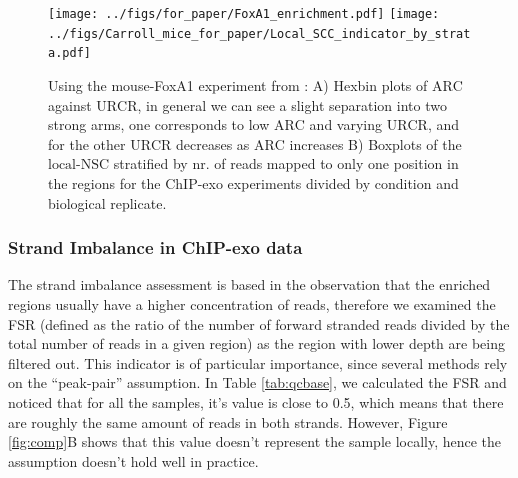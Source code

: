\documentclass[11pt]{article}\usepackage[]{graphicx}\usepackage[]{color}
\begin{document}
\begin{figure}[H]
  \centering
  \texttt{[image: ../figs/for\_paper/FoxA1\_enrichment.pdf]}
  \texttt{[image: ../figs/Carroll\_mice\_for\_paper/Local\_SCC\_indicator\_by\_strata.pdf]}
  \caption{Using the mouse-FoxA1 experiment from \cite{exoillumina}:
    A) Hexbin plots of $\mbox{ARC}$ against $\mbox{URCR}$, in general
    we can see a slight separation into two strong arms, one
    corresponds to low $\mbox{ARC}$ and varying $\mbox{URCR}$, and for
    the other $\mbox{URCR}$ decreases as $\mbox{ARC}$ increases B)
    Boxplots of the $\mbox{local-NSC}$ stratified by nr. of reads
    mapped to only one position in the regions for the ChIP-exo
    experiments divided by condition and biological replicate.}
  \label{fig:enrich}
\end{figure}



\subsubsection{Strand Imbalance in ChIP-exo data}
\label{sec:strand_imbalance}

The strand imbalance assessment is based in the observation that the
enriched regions usually have a higher concentration of reads,
therefore we examined the FSR (defined as the ratio of the number of
forward stranded reads divided by the total number of reads in a given
region) as the region with lower depth are being filtered out. This
indicator is of particular importance, since several methods rely on
the ``peak-pair'' assumption. In Table \ref{tab:qcbase}, we calculated
the FSR and noticed that for all the samples, it's value is close to
0.5, which means that there are roughly the same amount of reads in
both strands. However, Figure \ref{fig:comp}B shows that this value
doesn't represent the sample locally, hence the assumption doesn't
hold well in practice.
\end{document}
